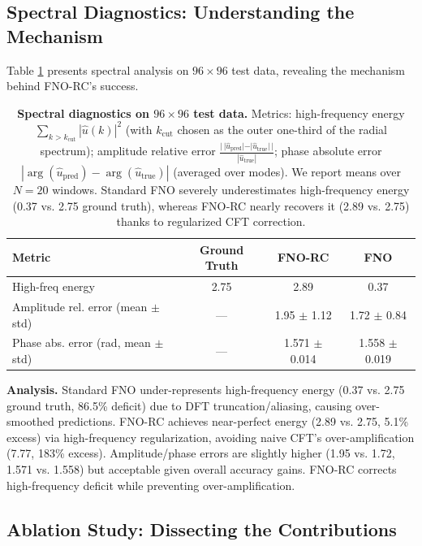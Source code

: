 \documentclass[11pt]{article}
\begin{document}
\subsection{Spectral Diagnostics: Understanding the Mechanism}
\label{sec:spectral}

Table \ref{tab:spectrum} presents spectral analysis on $96 \times 96$ test data, revealing the mechanism behind FNO-RC's success.

\begin{table}[h]
\centering
\caption{\textbf{Spectral diagnostics on $96 \times 96$ test data.} Metrics: high-frequency energy $\sum_{k>k_{\mathrm{cut}}}|\hat u(k)|^2$ (with $k_{\mathrm{cut}}$ chosen as the outer one-third of the radial spectrum); amplitude relative error $\frac{|\,|\hat u_{\mathrm{pred}}|-|\hat u_{\mathrm{true}}|\,|}{|\hat u_{\mathrm{true}}|}$; phase absolute error $|\arg(\hat u_{\mathrm{pred}})-\arg(\hat u_{\mathrm{true}})|$ (averaged over modes). We report means over $N=20$ windows. Standard FNO severely underestimates high-frequency energy (0.37 vs. 2.75 ground truth), whereas FNO‑RC nearly recovers it (2.89 vs. 2.75) thanks to regularized CFT correction.}
\label{tab:spectrum}
\small
\begin{tabular}{@{}lccc@{}}
\toprule
\textbf{Metric} & \textbf{Ground Truth} & \textbf{FNO-RC} & \textbf{FNO} \\
\midrule
High-freq energy & 2.75 & 2.89 & 0.37 \\
Amplitude rel. error (mean $\pm$ std) & --- & 1.95 $\pm$ 1.12 & 1.72 $\pm$ 0.84 \\
Phase abs. error (rad, mean $\pm$ std) & --- & 1.571 $\pm$ 0.014 & 1.558 $\pm$ 0.019 \\
\bottomrule
\end{tabular}
\end{table}

\textbf{Analysis.} Standard FNO under-represents high-frequency energy (0.37 vs. 2.75 ground truth, 86.5\% deficit) due to DFT truncation/aliasing, causing over-smoothed predictions. FNO-RC achieves near-perfect energy (2.89 vs. 2.75, 5.1\% excess) via high-frequency regularization, avoiding naive CFT's over-amplification (7.77, 183\% excess). Amplitude/phase errors are slightly higher (1.95 vs. 1.72, 1.571 vs. 1.558) but acceptable given overall accuracy gains. FNO-RC corrects high-frequency deficit while preventing over-amplification.

\subsection{Ablation Study: Dissecting the Contributions}
\end{document}
